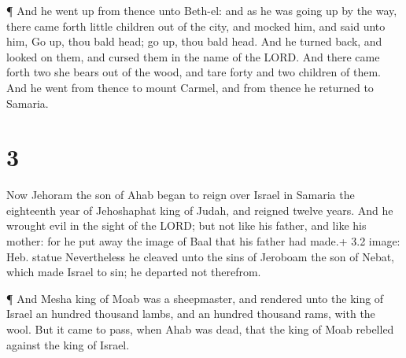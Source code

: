  ¶ And he went up from thence unto Beth-el: and as he was
going up by the way, there came forth little children out of the city,
and mocked him, and said unto him, Go up, thou bald head; go up, thou
bald head.  And he turned back, and looked on them, and
cursed them in the name of the LORD. And there came forth two she bears
out of the wood, and tare forty and two children of them. 
And he went from thence to mount Carmel, and from thence he returned to
Samaria.

\hypertarget{section-2}{%
\section{3}\label{section-2}}

 Now Jehoram the son of Ahab began to reign over Israel in
Samaria the eighteenth year of Jehoshaphat king of Judah, and reigned
twelve years.  And he wrought evil in the sight of the LORD;
but not like his father, and like his mother: for he put away the image
of Baal that his father had made.+ 3.2 image: Heb. statue 
Nevertheless he cleaved unto the sins of Jeroboam the son of Nebat,
which made Israel to sin; he departed not therefrom.

 ¶ And Mesha king of Moab was a sheepmaster, and rendered
unto the king of Israel an hundred thousand lambs, and an hundred
thousand rams, with the wool.  But it came to pass, when
Ahab was dead, that the king of Moab rebelled against the king of
Israel.

